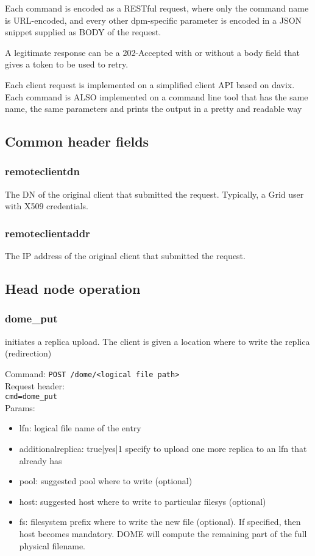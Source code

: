 \documentclass[a4paper,10pt]{scrreprt}
\begin{document}
Each command is encoded as a RESTful request, where only the command name is URL-encoded, and every other dpm-specific parameter is encoded in a JSON snippet supplied as BODY of the request.

A legitimate response can be a 202-Accepted with or without a body field that gives a token to be used to retry.

Each client request is implemented on a simplified client API based on davix.
Each command is ALSO implemented on a command line tool that has the same name, the same parameters and prints the output in a pretty and readable way\\

\subsection{Common header fields}


\subsubsection{remoteclientdn}
The DN of the original client that submitted the request. Typically, a Grid user with X509 credentials.\\

\subsubsection{remoteclientaddr}
The IP address of the original client that submitted the request.


\subsection{Head node operation}

\subsubsection{dome\_put}
initiates a replica upload. The client is given a location where to write the replica (redirection)

Command:
\lstinline"POST /dome/<logical file path>"\\
Request header:\\
\lstinline"cmd=dome_put"\\
Params:
\begin{itemize}
 \item lfn: logical file name of the entry
 \item additionalreplica: true|yes|1   specify to upload one more replica to an lfn that already has
 \item pool: suggested pool where to write (optional)
 \item host: suggested host where to write to particular filesys (optional)
 \item fs: filesystem prefix where to write the new file (optional). If specified, then host becomes mandatory. DOME will compute the remaining part of the full physical filename.
\end{itemize}
\end{document}
